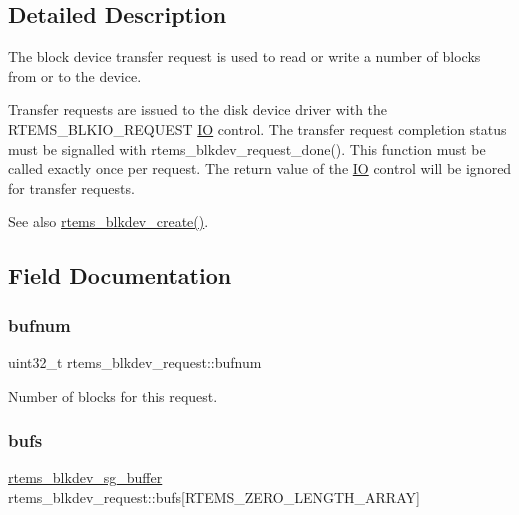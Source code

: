\subsection{Detailed Description}
The block device transfer request is used to read or write a number of blocks from or to the device. 

Transfer requests are issued to the disk device driver with the R\+T\+E\+M\+S\+\_\+\+B\+L\+K\+I\+O\+\_\+\+R\+E\+Q\+U\+E\+ST \mbox{\hyperlink{structIO}{IO}} control. The transfer request completion status must be signalled with rtems\+\_\+blkdev\+\_\+request\+\_\+done(). This function must be called exactly once per request. The return value of the \mbox{\hyperlink{structIO}{IO}} control will be ignored for transfer requests.

\begin{DoxySeeAlso}{See also}
\mbox{\hyperlink{group__rtems__blkdev_gae2fe7e8c05fa9db0fa7c0ec4e8e4967d}{rtems\+\_\+blkdev\+\_\+create()}}. 
\end{DoxySeeAlso}


\subsection{Field Documentation}
\mbox{\label{structrtems__blkdev__request_a76d2f6b5d6bc71c8cdab127a3f969181}} 
\subsubsection{\texorpdfstring{bufnum}{bufnum}}
{\footnotesize\ttfamily uint32\+\_\+t rtems\+\_\+blkdev\+\_\+request\+::bufnum}

Number of blocks for this request. \mbox{\label{structrtems__blkdev__request_a76108e3fa44f35927541a19db1164016}} 
\subsubsection{\texorpdfstring{bufs}{bufs}}
{\footnotesize\ttfamily \mbox{\hyperlink{structrtems__blkdev__sg__buffer}{rtems\+\_\+blkdev\+\_\+sg\+\_\+buffer}} rtems\+\_\+blkdev\+\_\+request\+::bufs\mbox{[}R\+T\+E\+M\+S\+\_\+\+Z\+E\+R\+O\+\_\+\+L\+E\+N\+G\+T\+H\+\_\+\+A\+R\+R\+AY\mbox{]}}

